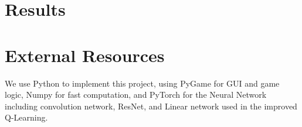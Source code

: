 \section{Results}

\section{External Resources}
We use Python to implement this project, using PyGame for GUI and game logic, Numpy for fast computation, and PyTorch for the Neural Network including convolution network, ResNet, and Linear network used in the improved Q-Learning. 